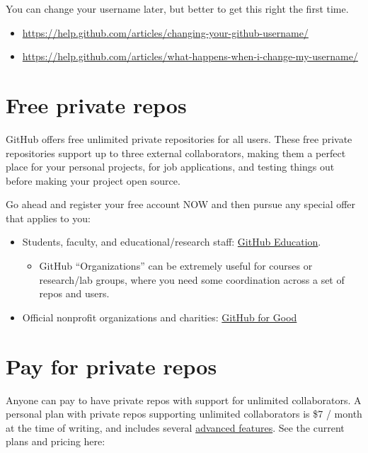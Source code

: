 \documentclass[
]{book}
\providecommand{\tightlist}{%
  \setlength{\itemsep}{0pt}\setlength{\parskip}{0pt}}
\begin{document}
You can change your username later, but better to get this right the first time.

\begin{itemize}
\tightlist
\item
  \url{https://help.github.com/articles/changing-your-github-username/}
\item
  \url{https://help.github.com/articles/what-happens-when-i-change-my-username/}
\end{itemize}

\section{Free private repos}\label{free-private-repos}

GitHub offers free unlimited private repositories for all users. These free private repositories support up to three external collaborators, making them a perfect place for your personal projects, for job applications, and testing things out before making your project open source.

Go ahead and register your free account NOW and then pursue any special offer that applies to you:

\begin{itemize}
\tightlist
\item
  Students, faculty, and educational/research staff: \href{https://education.github.com}{GitHub Education}.

  \begin{itemize}
  \tightlist
  \item
    GitHub ``Organizations'' can be extremely useful for courses or research/lab groups, where you need some coordination across a set of repos and users.
  \end{itemize}
\item
  Official nonprofit organizations and charities: \href{https://github.com/nonprofit}{GitHub for Good}
\end{itemize}

\section{Pay for private repos}\label{pay-for-private-repos}

Anyone can pay to have private repos with support for unlimited collaborators. A personal plan with private repos supporting unlimited collaborators is \$7 / month at the time of writing, and includes several \href{https://help.github.com/articles/github-s-products/\#github-pro}{advanced features}. See the current plans and pricing here:
\end{document}

